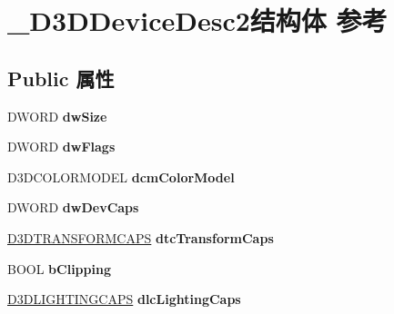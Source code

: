 \hypertarget{struct___d3_d_device_desc2}{}\section{\+\_\+\+D3\+D\+Device\+Desc2结构体 参考}
\label{struct___d3_d_device_desc2}
\subsection*{Public 属性}
\begin{DoxyCompactItemize}
\item 
\mbox{\label{struct___d3_d_device_desc2_a25a8349e940071d35870ec011f277466}} 
D\+W\+O\+RD {\bfseries dw\+Size}
\item 
\mbox{\label{struct___d3_d_device_desc2_a4282f3219d681011d89cec30bd270692}} 
D\+W\+O\+RD {\bfseries dw\+Flags}
\item 
\mbox{\label{struct___d3_d_device_desc2_acb7af493963e1300b636dd6849e06b18}} 
D3\+D\+C\+O\+L\+O\+R\+M\+O\+D\+EL {\bfseries dcm\+Color\+Model}
\item 
\mbox{\label{struct___d3_d_device_desc2_a7dc86732bb5526902d0b9053402ad003}} 
D\+W\+O\+RD {\bfseries dw\+Dev\+Caps}
\item 
\mbox{\label{struct___d3_d_device_desc2_a3a63dd1581e81af3a64140d36e531e4e}} 
\hyperlink{struct___d3_d_t_r_a_n_s_f_o_r_m_c_a_p_s}{D3\+D\+T\+R\+A\+N\+S\+F\+O\+R\+M\+C\+A\+PS} {\bfseries dtc\+Transform\+Caps}
\item 
\mbox{\label{struct___d3_d_device_desc2_a207b1fd4fcc36391b66018a5ad9631a8}} 
B\+O\+OL {\bfseries b\+Clipping}
\item 
\mbox{\label{struct___d3_d_device_desc2_ab069fa5f30a9fcc089380852fbe0f401}} 
\hyperlink{struct___d3_d_l_i_g_h_t_i_n_g_c_a_p_s}{D3\+D\+L\+I\+G\+H\+T\+I\+N\+G\+C\+A\+PS} {\bfseries dlc\+Lighting\+Caps}
\item 
\mbox{\label{struct___d3_d_device_desc2_a19a5349920b83c7b6f8ab3f91d32a4a1}} 

\end{DoxyCompactItemize}
